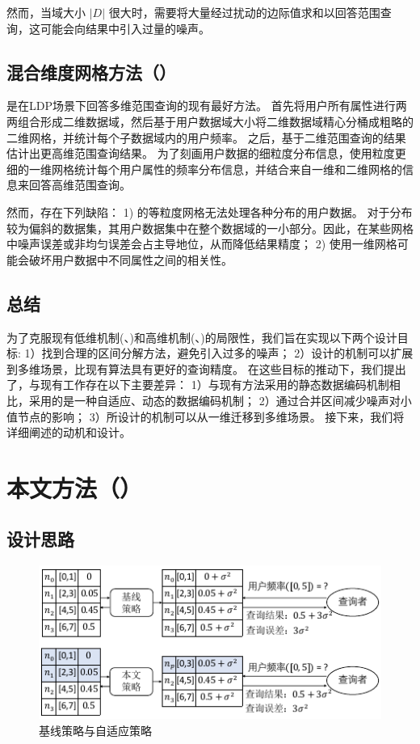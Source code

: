 然而，当域大小 $|D|$ 很大时，\mycalm 需要将大量经过扰动的边际值求和以回答范围查询，这可能会向结果中引入过量的噪声。

\subsection{混合维度网格方法（\myHDG）}
\myHDG \cite{yang2020answering}是在LDP场景下回答多维范围查询的现有最好方法。
\myHDG 首先将用户所有属性进行两两组合形成二维数据域，然后基于用户数据域大小将二维数据域精心分桶成粗略的二维网格，并统计每个子数据域内的用户频率。
之后，\myHDG 基于二维范围查询的结果估计出更高维范围查询结果。
为了刻画用户数据的细粒度分布信息，\myHDG 使用粒度更细的一维网格统计每个用户属性的频率分布信息，并结合来自一维和二维网格的信息来回答高维范围查询。

然而，\myHDG 存在下列缺陷：
1) \myHDG 的等粒度网格无法处理各种分布的用户数据。
对于分布较为偏斜的数据集，其用户数据集中在整个数据域的一小部分。因此，在某些网格中噪声误差或非均匀误差会占主导地位，从而降低结果精度；
2) 使用一维网格可能会破坏用户数据中不同属性之间的相关性。

\subsection{总结}
\label{Remarks}

为了克服现有低维机制(\myhio、\mydht)和高维机制(\mycalm、\myHDG)的局限性，我们旨在实现以下两个设计目标:
1）找到合理的区间分解方法，避免引入过多的噪声；
2）设计的机制可以扩展到多维场景，比现有算法具有更好的查询精度。
在这些目标的推动下，我们提出了\myahead，与现有工作存在以下主要差异：
1）与现有方法采用的静态数据编码机制相比，\myahead 采用的是一种自适应、动态的数据编码机制；
2）\myahead 通过合并区间减少噪声对小值节点的影响；
3）所设计的机制可以从一维迁移到多维场景。
接下来，我们将详细阐述\myahead 的动机和设计。

\section{本文方法（\myahead）}
\label{Adaptive Hierarchical Decomposition}

\subsection{设计思路}
\label{Motivation and Overview}
\begin{figure}[!t]
    \centering
    \includegraphics[width=0.75\hsize]{figure/ldp_range_query/figures_others/Motivation3ch.pdf}
    \caption{基线策略与自适应策略}
    \label{Method Motivation}
\end{figure} 

